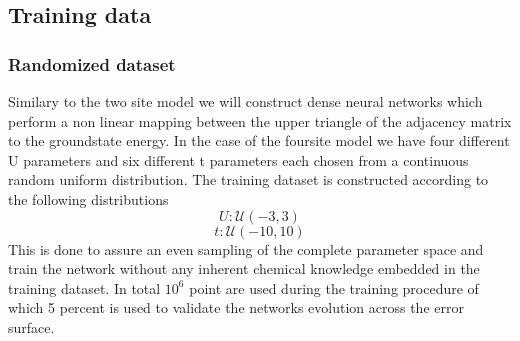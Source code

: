 \documentclass[]{article}
\begin{document}
\subsection{Training data}
 \subsubsection{Randomized dataset}
 Similary to the two site model we will construct dense neural networks which perform a non linear mapping between the upper triangle of the adjacency matrix to the groundstate energy. In the case of the foursite model we have four different U parameters and six different t parameters each chosen from a continuous random uniform distribution. The training dataset is constructed according to the following distributions
 \begin{equation*}
 	U: \mathcal{U}(-3, 3)
 \end{equation*}
 \begin{equation*}
 	t : \mathcal{U}(-10,10)
 \end{equation*}
 This is done to assure an even sampling of the complete parameter space and train the network without any inherent chemical knowledge embedded in the training dataset. In total $10^6$ point are used during the training procedure of which 5 percent  is used to validate the networks evolution across the error surface.
\end{document}
